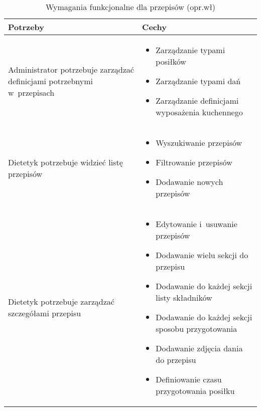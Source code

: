 \begin{minipage}{\textwidth}
    \begin{table}[H]
        \centering\caption{Wymagania funkcjonalne dla przepisów (opr.wł)\label{tabela:wymaganiaFunkcjonalnePrzepisy}}
        \begin{tabular}{|P{.3\textwidth}|P{.6\textwidth}|}
            \hline
            Potrzeby & Cechy \\

            \hline
            Administrator potrzebuje zarządzać definicjami potrzebnymi w~przepisach &
            \begin{itemize}
                \item Zarządzanie typami posiłków
                \item Zarządzanie typami dań
                \item Zarządzanie definicjami wyposażenia kuchennego
            \end{itemize} \\
            \hline
            Dietetyk potrzebuje widzieć listę przepisów &
            \begin{itemize}
                \item Wyszukiwanie przepisów
                \item Filtrowanie przepisów
                \item Dodawanie nowych przepisów
            \end{itemize} \\
            \hline
            Dietetyk potrzebuje zarządzać szczegółami przepisu &
            \begin{itemize}
                \item Edytowanie i~usuwanie przepisów
                \item Dodawanie wielu sekcji do przepisu
                \item Dodawanie do każdej sekcji listy składników
                \item Dodawanie do każdej sekcji sposobu przygotowania
                \item Dodawanie zdjęcia dania do przepisu
                \item Definiowanie czasu przygotowania posiłku
            \end{itemize} \\
            \hline
        \end{tabular}
    \end{table}
\end{minipage}

